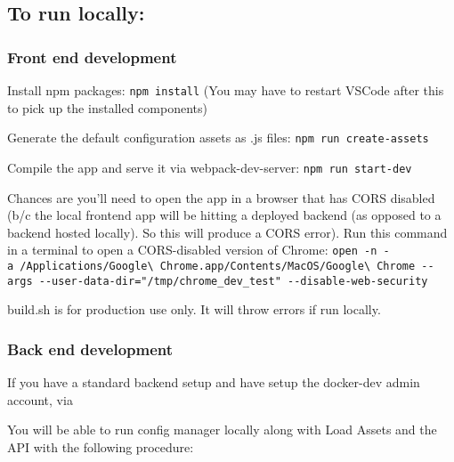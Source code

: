 \hypertarget{to-run-locally}{%
\subsection{To run locally:}\label{to-run-locally}}

\hypertarget{front-end-development}{%
\subsubsection{Front end development}\label{front-end-development}}

Install npm packages: \texttt{npm\ install} (You may have to restart
VSCode after this to pick up the installed components)

Generate the default configuration assets as .js files:
\texttt{npm\ run\ create-assets}

Compile the app and serve it via webpack-dev-server:
\texttt{npm\ run\ start-dev}

Chances are you'll need to open the app in a browser that has CORS
disabled (b/c the local frontend app will be hitting a deployed backend
(as opposed to a backend hosted locally). So this will produce a CORS
error). Run this command in a terminal to open a CORS-disabled version
of Chrome:
\texttt{open\ -n\ -a\ /Applications/Google\textbackslash{}\ Chrome.app/Contents/MacOS/Google\textbackslash{}\ Chrome\ -\/-args\ -\/-user-data-dir="/tmp/chrome\_dev\_test"\ -\/-disable-web-security}

build.sh is for production use only. It will throw errors if run
locally.

\hypertarget{back-end-development}{%
\subsubsection{Back end development}\label{back-end-development}}

If you have a standard backend setup and have setup the docker-dev admin
account, via

\begin{Shaded}
\begin{Highlighting}[]
\end{Highlighting}
\end{Shaded}

You will be able to run config manager locally along with Load Assets
and the API with the following procedure:

